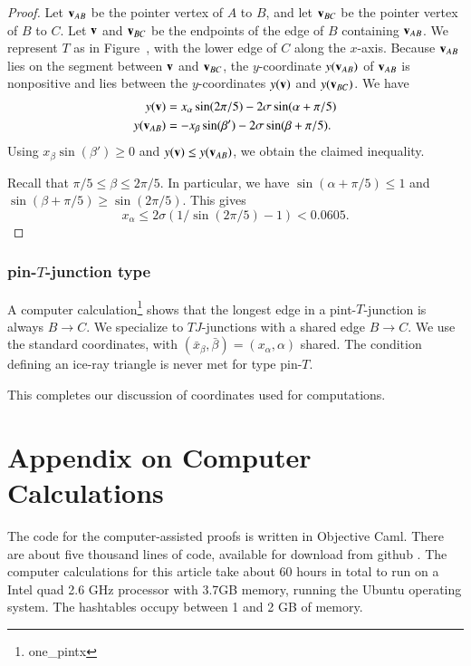 \begin{proof} Let ${\mathbf v}_{AB}$ be the pointer vertex of $A$ to $B$, and
  let ${\mathbf v}_{BC}$ be the pointer vertex of $B$ to $C$.  Let ${\mathbf v}$ and
  ${\mathbf v}_{BC}$ be the endpoints of the edge of $B$ containing ${\mathbf v}_{AB}$.
  We represent $T$ as in Figure~, with the lower edge of
  $C$ along the $x$-axis.  Because ${\mathbf v}_{AB}$ lies on the segment between
  ${\mathbf v}$ and ${\mathbf v}_{BC}$, the $y$-coordinate $y({\mathbf v}_{AB})$ of ${\mathbf v}_{AB}$ is
  nonpositive and lies between the $y$-coordinates $y({\mathbf v})$ and
  $y({\mathbf v}_{BC})$.  We have
\begin{align*}
y({\mathbf v}) &= x_\alpha \sin(2\pi/5) - 2\sigma\sin(\alpha+\pi/5)\\
y({\mathbf v}_{AB}) & = -x_\beta \sin(\beta') - 2\sigma\sin(\beta+\pi/5).
\end{align*}
Using $x_\beta \sin(\beta')\ge 0$ and $y({\mathbf v}) \le y({\mathbf v}_{AB})$, we
obtain the claimed inequality.

Recall that $\pi/5\le \beta \le 2\pi/5$.  In particular, we have
$\sin(\alpha+\pi/5) \le 1$ and $\sin(\beta+\pi/5)\ge \sin(2\pi/5)$.
This gives
\[
x_\alpha \le 2\sigma(1/\sin(2\pi/5) - 1) < 0.0605.
\]
\end{proof}

\subsubsection{pin-$T$-junction type}

A computer calculation\footnote{one\_pintx} shows that the longest
edge in a pint-$T$-junction is always $B\to C$.  We specialize to
$TJ$-junctions with a shared edge $B\to C$.  We use the standard
coordinates, with $(\bar x_\beta,\bar\beta)=(x_\alpha,\alpha)$ shared.
The condition defining an ice-ray triangle is never met for type
pin-$T$.


This completes our discussion of coordinates used for computations.

\section{Appendix on Computer Calculations}

The code for the computer-assisted proofs is written in Objective
Caml.  There are about five thousand lines of code, available for
download from github \cite{Git}.  The computer calculations for this
article take about 60 hours in total to run on a Intel quad 2.6 GHz
processor with 3.7GB memory, running the Ubuntu operating system.  The
hashtables occupy between  1 and 2 GB of memory.


